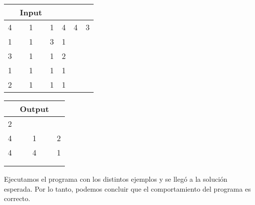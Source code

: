\documentclass[11pt, a4paper, twoside]{article}
\begin{document}
\begin{itemize}
\begin{itemize}
\begin{itemize}
					\begin{minipage}{0.4\textwidth}
							\begin{tabular}{cccccc}
							 & Input \\
							   \hline
							   4 & 1 & 1 & 4 & 4 & 3\\
							   1 & 1 & 3 & 1 &   &  \\
							   3 & 1 & 1 & 2 &   &  \\
							   1 & 1 & 1 & 1 &   &  \\
							   2 & 1 & 1 & 1 &   &  \\
							\end{tabular}
						\end{minipage} 
							\begin{minipage}{0.3\textwidth}
								\begin{tabular}{ccc}
								  & Output \\
								   \hline
								   2 &   &   \\
								   4 & 1 & 2 \\
								   4 & 4 & 1 \\
								    \\
								    \\
							\end{tabular}
					\end{minipage} 						
				
			\end{itemize}
	\end{itemize}
\end{itemize}

Ejecutamos el programa con los distintos ejemplos y se llegó a la solución esperada. 
Por lo tanto, podemos concluir que el comportamiento del programa es correcto. 
\end{document}
